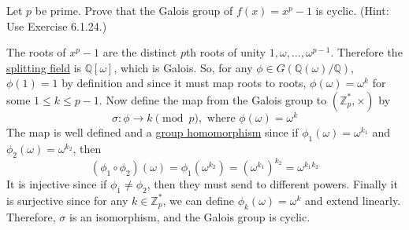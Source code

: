   \begin{exercise}[Shifrin 7.6.23]
    Let $p$ be prime. Prove that the Galois group of $f(x) = x^p - 1$ is cyclic. (Hint: Use Exercise 6.1.24.)
  \end{exercise}
  \begin{solution}
    The roots of $x^p - 1$ are the distinct $p$th roots of unity $1, \omega, \ldots, \omega^{p-1}$. Therefore the \hyperref[def:splitting-field]{splitting field} is $\mathbb{Q}[\omega]$, which is Galois. So, for any $\phi \in G(\mathbb{Q}(\omega)/\mathbb{Q})$, $\phi(1) = 1$ by definition and since it must map roots to roots, $\phi(\omega) = \omega^k$ for some $1 \leq k \leq p - 1$. Now define the map from the Galois group to $(\mathbb{Z}_p^\ast, \times)$ by 
    \begin{equation}
      \sigma:\phi \to k \pmod{p}, \text{ where } \phi(\omega) = \omega^k 
    \end{equation}
    The map is well defined and a \hyperref[def:group-homomorphism]{group homomorphism} since if $\phi_1 (\omega) = \omega^{k_1}$ and $\phi_2 (\omega) = \omega^{k_2}$, then 
    \begin{equation}
      (\phi_1 \circ \phi_2) (\omega) = \phi_1 (\omega^{k_2}) = (\omega^{k_1})^{k_2} = \omega^{k_1 k_2}
    \end{equation}
    It is injective since if $\phi_1 \neq \phi_2$, then they must send to different powers. Finally it is surjective since for any $k \in \mathbb{Z}_p^\ast$, we can define $\phi_k (\omega) = \omega^k$ and extend linearly. Therefore, $\sigma$ is an isomorphism, and the Galois group is cyclic.  
  \end{solution}

